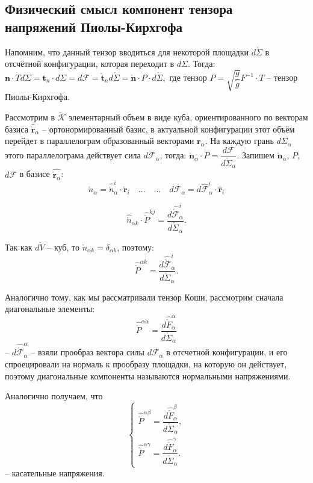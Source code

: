 \subsection{Физический смысл компонент тензора напряжений Пиолы-Кирхгофа}

Напомним, что данный тензор вводиться для некоторой площадки $d\mathring{\Sigma}$
в отсчётной конфигурации, которая переходит в $d\Sigma$. Тогда:
$\mathbf{n} \cdot T d\Sigma = \mathbf{t}_n \cdot d\Sigma =
d\mathbf{\mathcal{F}}
= \mathring{\mathbf{t}}_n d\mathring{\Sigma} = \mathring{\mathbf{n}} \cdot P \cdot d\mathring{\Sigma},$
где тензор $P = \sqrt{\dfrac{g}{\mathring{g}}} F^{-1} \cdot T$ -- тензор Пиолы-Кирхгофа.

Рассмотрим в $\mathring{\mathcal{K}}$ элементарный объем в виде куба, 
ориентированного по векторам базиса $\hat{\mathring{\mathbf{r}}}_\alpha$ --
ортонормированный базис, в актуальной конфигурации этот объём перейдет в
параллелограм образованный векторами $\mathbf{r}_\alpha$.
На каждую грань $d\Sigma_\alpha$ этого параллелограма действует сила
$d\mathbf{\mathcal{F}}_\alpha$, тогда:
$\mathring{\mathbf{n}}_\alpha \cdot P = \dfrac{d\mathbf{\mathcal{F}}}{d\mathring{\Sigma}_\alpha}$.
Запишем $\mathring{\mathbf{n}}_\alpha$, $P$, $d\mathbf{\mathcal{F}}$ в базисе
$\hat{\mathring{\mathbf{r}}_\alpha}$:
\[
  \mathring{n}_\alpha = \hat{\mathring{n}}^i_\alpha \cdot \mathring{\mathbf{r}}_i
  \quad
  \dots
  \quad
  \dots
  \quad
  d\mathbf{\mathcal{F}}_\alpha = d\hat{\mathbf{\mathcal{F}}}^i_\alpha \cdot \hat{\mathbf{r}}_i
\]

\[
  \hat{\mathring{n}}_{\alpha k} \cdot \hat{\mathring{P}}^{kj} = \dfrac{d\hat{\mathring{\mathcal{F}}}^i_\alpha}{d\mathring{\Sigma}_\alpha}.
\]

Так как $d\mathring{V}$ -- куб, то $\mathring{n}_{\alpha k } = \delta_{\alpha k}$,
поэтому:
\[
  \hat{\mathring{P}}^{\alpha k} = \dfrac{d\hat{\mathring{\mathcal{F}}}^i_\alpha}{d\mathring{\Sigma}_\alpha}.
\]

Аналогично тому, как мы рассматривали тензор Коши, рассмотрим сначала диагональные
элементы:
\[
  \hat{\mathring{P}}^{\alpha\alpha} = \dfrac{d\hat{\mathring{F}}^{\alpha}_\alpha}{d\mathring{\Sigma}_\alpha}
\]
-- $d\hat{\mathring{\mathcal{F}}}^\alpha_\alpha$ -- взяли прообраз вектора силы
$d\mathbf{\mathcal{F}}_\alpha$ в отсчетной конфигурации, и его спроецировали на 
нормаль к прообразу площадки, на которую он действует, поэтому диагональные
компоненты называются нормальными напряжениями.

Аналогично получаем, что 
\[
  \begin{cases}
    \hat{\mathring{P}}^{\alpha\beta} = \dfrac{d\hat{\mathring{F}}^\beta_\alpha}{d\mathring{\Sigma}_\alpha}, \\
    \hat{\mathring{P}}^{\alpha\gamma} = \dfrac{d\hat{\mathring{F}}^\gamma_\alpha}{d\mathring{\Sigma}_\alpha}.
  \end{cases}
\]
-- касательные напряжения.


